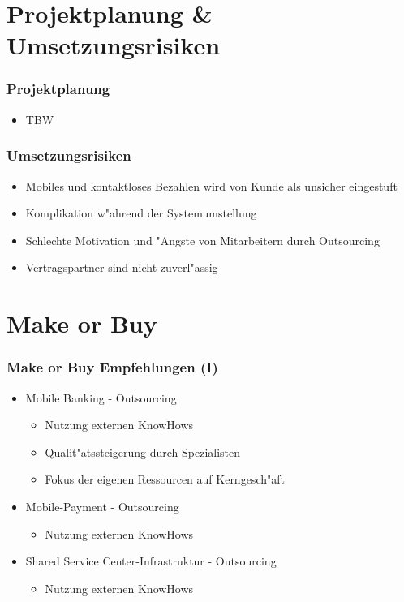\documentclass{beamer}
\begin{document}
\section{Projektplanung \& Umsetzungsrisiken}

\begin{frame}
  \frametitle{Projektplanung}
  \begin{itemize}

	\item TBW

  \end{itemize}
\end{frame}

\begin{frame}
  \frametitle{Umsetzungsrisiken}
  \begin{itemize}

	\item Mobiles und kontaktloses Bezahlen wird von Kunde als unsicher eingestuft \vspace{2mm}
	\item Komplikation w"ahrend der Systemumstellung\vspace{2mm}
	\item Schlechte Motivation und "Angste von Mitarbeitern durch Outsourcing\vspace{2mm}
	\item Vertragspartner sind nicht zuverl"assig

  \end{itemize}
\end{frame}

\section{Make or Buy}
\begin{frame}
  \frametitle{Make or Buy Empfehlungen (I)}
  \begin{itemize}

	\item Mobile Banking - Outsourcing
		\begin{itemize}
			\item Nutzung externen KnowHows
			\item Qualit"atssteigerung durch Spezialisten
			\item Fokus der eigenen Ressourcen auf Kerngesch"aft\vspace{2mm}
		\end{itemize}
	\item Mobile-Payment - Outsourcing
		\begin{itemize}
			\item Nutzung externen KnowHows\vspace{2mm}
		\end{itemize}
	\item Shared Service Center-Infrastruktur - Outsourcing
			\begin{itemize}
			\item Nutzung externen KnowHows\vspace{2mm}
		\end{itemize}

  \end{itemize}
\end{frame}
\end{document}
